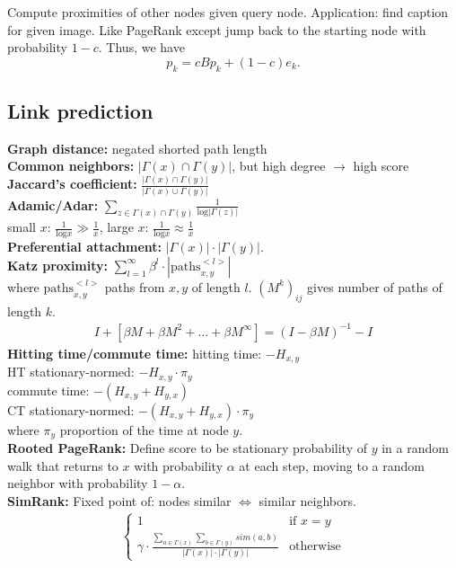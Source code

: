 Compute proximities of other nodes given query node. Application: find caption for given image. Like PageRank except jump back to the starting node with probability $1-c$. Thus, we have
$$
p_k = c B p_k + (1-c) e_k.
$$

\subsection*{Link prediction}
\textbf{Graph distance:} negated shorted path length\\
\textbf{Common neighbors:} $|\Gamma(x) \cap \Gamma(y)|$, but high degree $\rightarrow$ high score\\
\textbf{Jaccard's coefficient:} $\frac{|\Gamma(x) \cap \Gamma(y)|}{|\Gamma(x) \cup \Gamma(y)|}$\\
\textbf{Adamic/Adar:} $\sum_{z \in \Gamma(x) \cap \Gamma(y)} \frac{1}{\text{log} | \Gamma(z) |}$\\
small $x$: $\frac{1}{\text{log}x} \gg \frac{1}{x}$, large $x$: $\frac{1}{\text{log}x} \approx \frac{1}{x}$\\
\textbf{Preferential attachment:} $|\Gamma(x)| \cdot |\Gamma(y)|$.\\
\textbf{Katz proximity:} $\sum_{l=1}^{\infty} \beta^l \cdot |\text{paths}_{x,y}^{<l>}|$\\
where $\text{paths}_{x,y}^{<l>}$ paths from $x,y$ of length $l$. $(M^k)_{ij}$ gives number of paths of length $k$.
\begin{align*} 
    I + [ \beta M + \beta M^2 + \ldots + \beta M^{\infty}] = (I - \beta M)^{-1} - I
\end{align*}
\textbf{Hitting time/commute time:} 
hitting time: $-H_{x,y}$ \\
HT stationary-normed: $-H_{x,y} \cdot \pi_y$ \\
commute time: $-(H_{x,y} + H_{y,x})$ \\
CT stationary-normed: $-(H_{x,y} + H_{y,x}) \cdot \pi_y$\\
where $\pi_y$ proportion of the time at node $y$.\\
\textbf{Rooted PageRank:} Define score to be stationary probability of $y$ in a random walk that returns to $x$ with probability $\alpha$ at each step, moving to a random neighbor with probability $1 - \alpha$.\\
\textbf{SimRank:} Fixed point of: nodes similar $\Leftrightarrow$ similar neighbors. 
\begin{align*}
    \begin{cases}
        1 & \text{if } x=y\\
        \gamma \cdot \frac{\sum_{a \in \Gamma(x)} \sum_{b \in \Gamma(y)} sim(a,b)}{|\Gamma(x)| \cdot |\Gamma(y)|} & \text{otherwise}
    \end{cases}
\end{align*}
